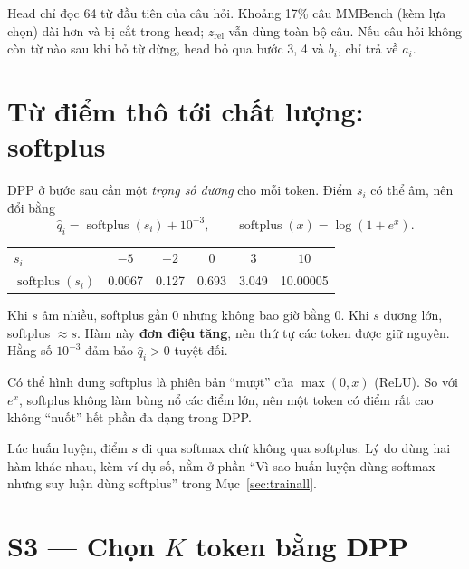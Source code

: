 \documentclass[11pt,a4paper]{article}
\newcommand{\qhat}{\hat{q}}
\newcommand{\softplus}{\operatorname{softplus}}
\begin{document}
\begin{luuy}
Head chỉ đọc 64 từ đầu tiên của câu hỏi. Khoảng 17\% câu MMBench (kèm lựa chọn) dài hơn và bị cắt trong head; $z_\text{rel}$ vẫn dùng toàn bộ câu. Nếu câu hỏi không còn từ nào sau khi bỏ từ dừng, head bỏ qua bước 3, 4 và $b_i$, chỉ trả về $a_i$.
\end{luuy}

\section{Từ điểm thô tới chất lượng: softplus}
DPP ở bước sau cần một \emph{trọng số dương} cho mỗi token. Điểm $s_i$ có thể âm, nên đổi bằng
\begin{equation}
\qhat_i=\softplus(s_i)+10^{-3},\qquad \softplus(x)=\log(1+e^{x}).
\end{equation}

\begin{vidu}
\begin{center}
\begin{tabular}{@{}lccccc@{}}
\toprule
$s_i$ & $-5$ & $-2$ & $0$ & $3$ & $10$\\
$\softplus(s_i)$ & 0.0067 & 0.127 & 0.693 & 3.049 & 10.00005\\
\bottomrule
\end{tabular}
\end{center}
Khi $s$ âm nhiều, softplus gần 0 nhưng không bao giờ bằng 0. Khi $s$ dương lớn, softplus $\approx s$. Hàm này \textbf{đơn điệu tăng}, nên thứ tự các token được giữ nguyên. Hằng số $10^{-3}$ đảm bảo $\qhat_i>0$ tuyệt đối.
\end{vidu}

\begin{trucgiac}
Có thể hình dung softplus là phiên bản ``mượt'' của $\max(0,x)$ (ReLU). So với $e^{x}$, softplus không làm bùng nổ các điểm lớn, nên một token có điểm rất cao không ``nuốt'' hết phần đa dạng trong DPP.
\end{trucgiac}
Lúc huấn luyện, điểm $s$ đi qua softmax chứ không qua softplus. Lý do dùng hai hàm khác nhau, kèm ví dụ số, nằm ở phần ``Vì sao huấn luyện dùng softmax nhưng suy luận dùng softplus'' trong Mục~\ref{sec:trainall}.

\section{S3 --- Chọn $K$ token bằng DPP}
\label{sec:dpp}
\end{document}
